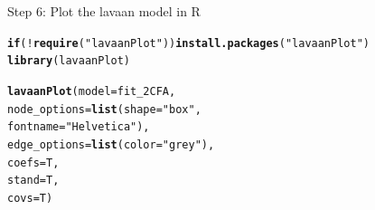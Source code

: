 \documentclass[10pt]{beamer}\usepackage[]{graphicx}\usepackage[]{xcolor}
\makeatletter
\newcommand{\hlstr}[1]{\textcolor[rgb]{0.192,0.494,0.8}{#1}}%
\newcommand{\hlopt}[1]{\textcolor[rgb]{0,0,0}{#1}}%
\newcommand{\hlstd}[1]{\textcolor[rgb]{0.345,0.345,0.345}{#1}}%
\newcommand{\hlkwa}[1]{\textcolor[rgb]{0.161,0.373,0.58}{\textbf{#1}}}%
\newcommand{\hlkwc}[1]{\textcolor[rgb]{0.333,0.667,0.333}{#1}}%
\newcommand{\hlkwd}[1]{\textcolor[rgb]{0.737,0.353,0.396}{\textbf{#1}}}%
\newenvironment{kframe}{%
 \def\at@end@of@kframe{}%
 \ifinner\ifhmode%
  \def\at@end@of@kframe{\end{minipage}}%
  \begin{minipage}{\columnwidth}%
 \fi\fi%
 \def\FrameCommand##1{\hskip\@totalleftmargin \hskip-\fboxsep
 \colorbox{shadecolor}{##1}\hskip-\fboxsep
     \hskip-\linewidth \hskip-\@totalleftmargin \hskip\columnwidth}%
 \MakeFramed {\advance\hsize-\width
   \@totalleftmargin\z@ \linewidth\hsize
   \@setminipage}}%
 {\par\unskip\endMakeFramed%
 \at@end@of@kframe}
\newenvironment{knitrout}{}{} %
\makeatother
\begin{document}
\begin{frame}[fragile]{Step 6: Plot the lavaan model in R}

\begin{knitrout}
\color{fgcolor}\begin{kframe}
\begin{alltt}
\hlkwa{if} \hlstd{(}\hlopt{!}\hlkwd{require}\hlstd{(}\hlstr{"lavaanPlot"}\hlstd{))} \hlkwd{install.packages}\hlstd{(}\hlstr{"lavaanPlot"}\hlstd{)}
\hlkwd{library}\hlstd{(lavaanPlot)}
\end{alltt}
\end{kframe}
\end{knitrout}
\begin{knitrout}
\color{fgcolor}\begin{kframe}
\begin{alltt}
\hlkwd{lavaanPlot}\hlstd{(}\hlkwc{model} \hlstd{= fit_2CFA,}
           \hlkwc{node_options} \hlstd{=} \hlkwd{list}\hlstd{(}\hlkwc{shape} \hlstd{=} \hlstr{"box"}\hlstd{,}
                               \hlkwc{fontname} \hlstd{=} \hlstr{"Helvetica"}\hlstd{),}
           \hlkwc{edge_options} \hlstd{=} \hlkwd{list}\hlstd{(}\hlkwc{color} \hlstd{=} \hlstr{"grey"}\hlstd{),}
           \hlkwc{coefs} \hlstd{= T,}
           \hlkwc{stand} \hlstd{= T,}
           \hlkwc{covs} \hlstd{= T)}
\end{alltt}
\end{kframe}
\end{knitrout}
\end{frame}
%
\end{document}
